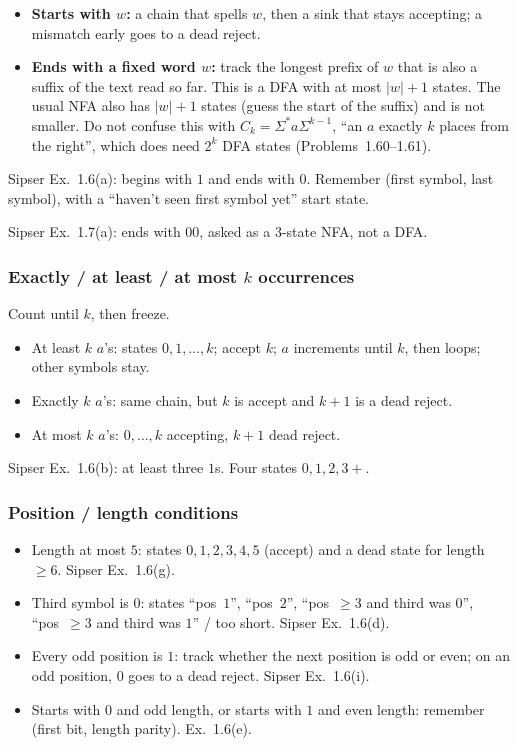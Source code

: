 \documentclass[11pt,a4paper]{article}
\begin{document}
\begin{itemize}[nosep]
  \item \textbf{Starts with $w$:} a chain that spells $w$, then a sink
        that stays accepting; a mismatch early goes to a dead reject.
  \item \textbf{Ends with a fixed word $w$:} track the longest prefix
        of $w$ that is also a suffix of the text read so far. This is
        a DFA with at most $|w|+1$ states. The usual NFA also has
        $|w|+1$ states (guess the start of the suffix) and is not
        smaller. Do not confuse this with $C_k=\Sigma^*a\Sigma^{k-1}$,
        ``an $a$ exactly $k$ places from the right'', which does need
        $2^k$ DFA states (Problems~1.60--1.61).
\end{itemize}

Sipser Ex.~1.6(a): begins with $1$ and ends with $0$. Remember
(first symbol, last symbol), with a ``haven't seen first symbol yet''
start state.

Sipser Ex.~1.7(a): ends with $00$, asked as a $3$-state NFA, not a DFA.

\subsubsection{Exactly / at least / at most $k$ occurrences}

Count until $k$, then freeze.

\begin{itemize}[nosep]
  \item At least $k$ $a$'s: states $0,1,\dots,k$; accept $k$; $a$
        increments until $k$, then loops; other symbols stay.
  \item Exactly $k$ $a$'s: same chain, but $k$ is accept and $k+1$ is a
        dead reject.
  \item At most $k$ $a$'s: $0,\dots,k$ accepting, $k+1$ dead reject.
\end{itemize}

Sipser Ex.~1.6(b): at least three $1$s. Four states $0,1,2,3+$.

\subsubsection{Position / length conditions}

\begin{itemize}[nosep]
  \item Length at most $5$: states $0,1,2,3,4,5$ (accept) and a dead
        state for length $\ge 6$. Sipser Ex.~1.6(g).
  \item Third symbol is $0$: states ``pos~$1$'', ``pos~$2$'',
        ``pos~$\ge 3$ and third was $0$'', ``pos~$\ge 3$ and third was
        $1$'' / too short. Sipser Ex.~1.6(d).
  \item Every odd position is $1$: track whether the next position is
        odd or even; on an odd position, $0$ goes to a dead reject.
        Sipser Ex.~1.6(i).
  \item Starts with $0$ and odd length, or starts with $1$ and even
        length: remember (first bit, length parity). Ex.~1.6(e).
\end{itemize}
\end{document}
